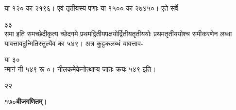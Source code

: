 \documentclass[11pt, openany]{book}
\begin{document}
\begin{sloppypar}
\hangindent=0.2in या १२० का २१९६। एवं तृतीयस्य पणाः या १५०० का २७४५०। एते सर्वे

\hspace{0.8in}३\hspace{2.6in}३\\

\hangindent=0.2in समा इति समच्छेदीकृत्य च्छेदगमे प्रथमद्वितीयपक्षयोर्द्वितीयतृतीययोः प्रथमतृतीययोश्च समीकरणेन लब्धा यावत्तावदुन्मितिस्तुल्यैव का ५४९। अत्र कुट्टकलब्धं यावत्ताव-

\hspace{1.8in}या ३०\\

\hangindent=0.2in न्मानं नी ५४९ रू ०। नीलकमेकेनोत्थाप्य जातः क्रयः ५४९ इति।

\hspace{0.7in}२२
\end{sloppypar}
\thispagestyle{empty}
\newpage

\onehalfspacing
१७०\hspace{2in}\textbf{बीजगणितम्।} 

\vspace{5mm}
 
\end{document}
